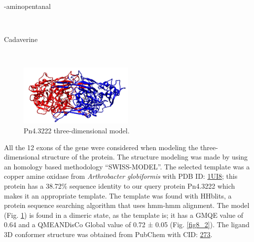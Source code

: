 \documentclass[12pt]{article}
\begin{document}
	\vspace{-50pt}\hspace{0.5\paperwidth-20pt}
	\begin{minipage}{0.345\paperwidth}
		-aminopentanal
	\end{minipage}\\
	
	\vspace{-37pt}\hspace{20pt}
	\begin{minipage}{0.345\paperwidth}
		\centering
		Cadaverine
	\end{minipage}\\
	
	\FloatBarrier
	\begin{figure}
		\centering
		\includegraphics[width=0.5\textwidth]{../8/Minimize/model2.png}
		\caption{\centering Pn4.3222 three-dimensional model.}
		\label{fig8_1}
	\end{figure}
	\FloatBarrier
	
	All the 12 exons of the gene were considered when modeling the three-dimensional structure of the protein. The structure modeling was made by using an homology based methodology ``SWISS-MODEL''. \cite{swiss} The selected template was a copper amine oxidase from \textit{Arthrobacter globiformis} with PDB ID: \href{https://www.rcsb.org/structure/1UI8}{1UI8}; this protein has a 38.72\% sequence identity to our query protein Pn4.3222 which makes it an appropriate template. The template was found with HHblits, a protein sequence searching algorithm that uses hmm-hmm alignment. \cite{hhblits} The model (Fig. \ref{fig8_1}) is found in a dimeric state, as the template is; it has a GMQE value of 0.64 and a QMEANDisCo Global value of 0.72 ± 0.05 (Fig. \ref{fig8_2}). \cite{qmeandisco_swiss} The ligand 3D conformer structure was obtained from PubChem with CID: \href{https://pubchem.ncbi.nlm.nih.gov/compound/273}{273}.
	
\end{document}
